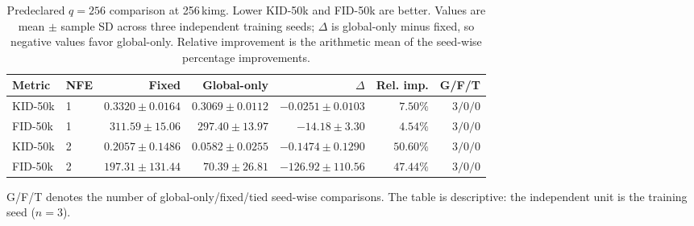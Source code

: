 \begin{table}[t]
  \centering
  \caption{Predeclared $q=256$ comparison at 256\,kimg. Lower KID-50k and
  FID-50k are better. Values are mean $\pm$ sample SD across three independent
  training seeds; $\Delta$ is global-only minus fixed, so negative values favor
  global-only. Relative improvement is the arithmetic mean of the seed-wise
  percentage improvements.}
  \label{tab:q256-256k-main}
  \small
  \setlength{\tabcolsep}{3.5pt}
  \begin{tabular}{llrrrrr}
    \toprule
    Metric & NFE & Fixed & Global-only & $\Delta$ & Rel. imp. & G/F/T \\
    \midrule
    KID-50k & 1 & $0.3320 \pm 0.0164$ & $0.3069 \pm 0.0112$ & $-0.0251 \pm 0.0103$ & $7.50\%$ & $3/0/0$ \\
    FID-50k & 1 & $311.59 \pm 15.06$ & $297.40 \pm 13.97$ & $-14.18 \pm 3.30$ & $4.54\%$ & $3/0/0$ \\
    KID-50k & 2 & $0.2057 \pm 0.1486$ & $0.0582 \pm 0.0255$ & $-0.1474 \pm 0.1290$ & $50.60\%$ & $3/0/0$ \\
    FID-50k & 2 & $197.31 \pm 131.44$ & $70.39 \pm 26.81$ & $-126.92 \pm 110.56$ & $47.44\%$ & $3/0/0$ \\
    \bottomrule
  \end{tabular}

  \vspace{2pt}
  \parbox{0.94\linewidth}{\footnotesize G/F/T denotes the number of
  global-only/fixed/tied seed-wise comparisons. The table is descriptive:
  the independent unit is the training seed ($n=3$).}
\end{table}
